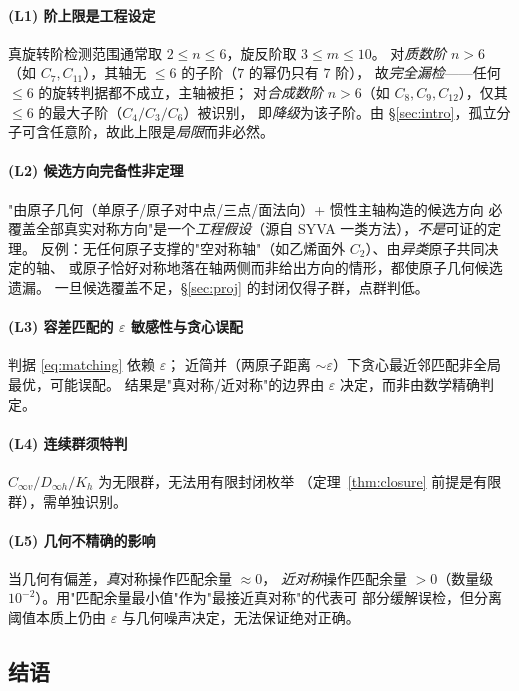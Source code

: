 \paragraph{(L1) 阶上限是工程设定}
真旋转阶检测范围通常取 $2\le n\le 6$，旋反阶取 $3\le m\le 10$。
对\emph{质数阶} $n>6$（如 $C_7,C_{11}$），其轴无 $\le6$ 的子阶（$7$ 的幂仍只有 $7$ 阶），
故\emph{完全漏检}——任何 $\le6$ 的旋转判据都不成立，主轴被拒；
对\emph{合成数阶} $n>6$（如 $C_8,C_9,C_{12}$），仅其 $\le6$ 的最大子阶（$C_4/C_3/C_6$）被识别，
即\emph{降级}为该子阶。由 \S\ref{sec:intro}，孤立分子可含任意阶，故此上限是\emph{局限}而非必然。

\paragraph{(L2) 候选方向完备性非定理}
"由原子几何（单原子/原子对中点/三点/面法向）+ 惯性主轴构造的候选方向
必覆盖全部真实对称方向"是一个\emph{工程假设}（源自 SYVA 一类方法），\emph{不是}可证的定理。
反例：无任何原子支撑的"空对称轴"（如乙烯面外 $C_2$）、由\emph{异类}原子共同决定的轴、
或原子恰好对称地落在轴两侧而非给出方向的情形，都使原子几何候选遗漏。
一旦候选覆盖不足，\S\ref{sec:proj} 的封闭仅得子群，点群判低。

\paragraph{(L3) 容差匹配的 $\varepsilon$ 敏感性与贪心误配}
判据 \eqref{eq:matching} 依赖 $\varepsilon$；
近简并（两原子距离 $\sim\varepsilon$）下贪心最近邻匹配非全局最优，可能误配。
结果是"真对称/近对称"的边界由 $\varepsilon$ 决定，而非由数学精确判定。

\paragraph{(L4) 连续群须特判}
$C_{\infty v}/D_{\infty h}/K_h$ 为无限群，无法用有限封闭枚举
（定理~\ref{thm:closure} 前提是有限群），需单独识别。

\paragraph{(L5) 几何不精确的影响}
当几何有偏差，\emph{真}对称操作匹配余量 $\approx 0$，
\emph{近对称}操作匹配余量 $>0$（数量级 $10^{-2}$）。用"匹配余量最小值"作为"最接近真对称"的代表可
部分缓解误检，但分离阈值本质上仍由 $\varepsilon$ 与几何噪声决定，无法保证绝对正确。

\subsection{结语}

